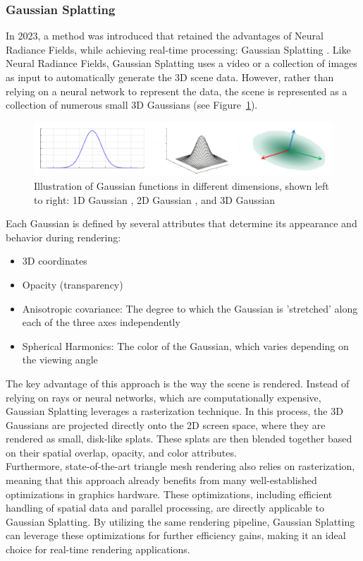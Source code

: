 \documentclass[12pt]{article}
\begin{document}
\subsubsection{Gaussian Splatting}
In 2023, a method was introduced that retained the advantages of Neural Radiance Fields, while achieving real-time processing: Gaussian Splatting \parencite{OriginalSplatting}. Like Neural Radiance Fields, Gaussian Splatting uses a video or a collection of images as input to automatically generate the 3D scene data. However, rather than relying on a neural network to represent the data, the scene is represented as a collection of numerous small 3D Gaussians (see Figure~\ref{fig:Form}).
\begin{figure}[h!]
	\centering
	\includegraphics[width=\textwidth]{Images/GaussianForm.png}
	\caption{Illustration of Gaussian functions in different dimensions, shown left to right: 1D Gaussian \parencite{1DGaussian}, 2D Gaussian \parencite{2DGaussian}, and 3D Gaussian \parencite{3DGaussian}}
	\label{fig:Form}
\end{figure}
\newpage  \noindent
Each Gaussian is defined by several attributes that determine its appearance and behavior during rendering:
\begin{itemize}
	\item 3D coordinates
	\item Opacity (transparency)
	\item Anisotropic covariance: The degree to which the Gaussian is 'stretched' along each of the three axes independently
	\item Spherical Harmonics: The color of the Gaussian, which varies depending on the viewing angle
\end{itemize}
The key advantage of this approach is the way the scene is rendered. Instead of relying on rays or neural networks, which are computationally expensive, Gaussian Splatting leverages a rasterization technique. In this process, the 3D Gaussians are projected directly onto the 2D screen space, where they are rendered as small, disk-like splats. These splats are then blended together based on their spatial overlap, opacity, and color attributes.\\
Furthermore, state-of-the-art triangle mesh rendering also relies on rasterization, meaning that this approach already benefits from many well-established optimizations in graphics hardware. These optimizations, including efficient handling of spatial data and parallel processing, are directly applicable to Gaussian Splatting. By utilizing the same rendering pipeline, Gaussian Splatting can leverage these optimizations for further efficiency gains, making it an ideal choice for real-time rendering applications.
\end{document}
